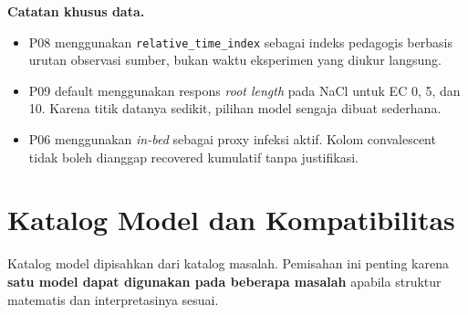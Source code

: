 \documentclass[11pt,a4paper]{article}
\begin{document}
\textbf{Catatan khusus data.}
\begin{itemize}
    \item P08 menggunakan \texttt{relative\_time\_index} sebagai indeks pedagogis berbasis urutan observasi sumber, bukan waktu eksperimen yang diukur langsung.
    \item P09 default menggunakan respons \textit{root length} pada NaCl untuk EC 0, 5, dan 10. Karena titik datanya sedikit, pilihan model sengaja dibuat sederhana.
    \item P06 menggunakan \textit{in-bed} sebagai proxy infeksi aktif. Kolom convalescent tidak boleh dianggap recovered kumulatif tanpa justifikasi.
\end{itemize}

\section{Katalog Model dan Kompatibilitas}

Katalog model dipisahkan dari katalog masalah. Pemisahan ini penting karena \textbf{satu model dapat digunakan pada beberapa masalah} apabila struktur matematis dan interpretasinya sesuai.
\end{document}
